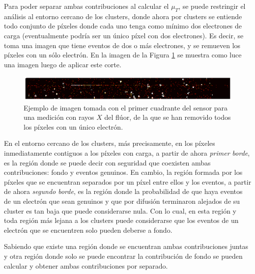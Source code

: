 Para poder separar ambas contribuciones al calcular el $\mu_{T}$, se puede restringir el análisis al entorno cercano de los clusters, donde ahora por clusters se entiende todo conjunto de píxeles donde cada uno tenga como mínimo dos electrones de carga (eventualmente podría ser un único píxel con dos electrones). Es decir, se toma una imagen que tiene eventos de dos o más electrones, y se remueven los píxeles con un sólo electrón. 
En la imagen de la Figura \ref{fig:ImagenFits2omasElectrones} se muestra como luce una imagen luego de aplicar este corte.
\begin{figure}[h]
    \centering
    \includegraphics[scale=0.4]{Figs/imagen_fits_2_o_mas.pdf}
    \caption{Ejemplo de imagen tomada con el primer cuadrante del sensor para una medición con rayos $X$ del flúor, de la que se han removido todos los píxeles con un único electrón.}
    \label{fig:ImagenFits2omasElectrones}
\end{figure}
En el entorno cercano de los clusters, más precisamente, en los píxeles inmediatamente contiguos a los píxeles con carga, a partir de ahora  \textit{primer borde}, es la región donde se puede decir con seguridad que coexisten ambas contribuciones: fondo y eventos genuinos. En cambio, la región formada por los píxeles que se encuentran separados por un píxel entre ellos y los eventos, a partir de ahora \textit{segundo borde}, es la región donde la probabilidad de que haya eventos de un electrón que sean genuinos y que por difusión terminaron alejados de su cluster es tan baja que puede considerarse nula. 
Con lo cual, en esta región y toda región más lejana a los clusters puede considerarse que los eventos de un electrón que se encuentren solo pueden deberse a fondo.

Sabiendo que existe una región donde se encuentran ambas contribuciones juntas y otra región donde solo se puede encontrar la contribución de fondo se pueden calcular y obtener ambas contribuciones por separado.

